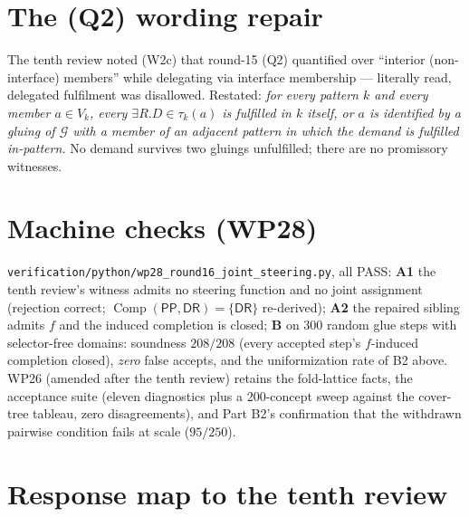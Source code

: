 \documentclass[11pt]{article}
\theoremstyle{definition}
\newcommand{\PP}{\mathsf{PP}}
\newcommand{\DR}{\mathsf{DR}}
\newcommand{\Comp}{\operatorname{Comp}}
\newcommand{\code}[1]{\texttt{#1}}
\begin{document}
\section{The (Q2) wording repair}\label{sec:q2}

The tenth review noted (W2c) that round-15 (Q2) quantified over
``interior (non-interface) members'' while delegating via interface
membership --- literally read, delegated fulfilment was disallowed.
Restated: \emph{for every pattern $k$ and every member $a\in V_k$,
every $\exists R.D\in\tau_k(a)$ is fulfilled in $k$ itself, or $a$ is
identified by a gluing of $\mathcal G$ with a member of an adjacent
pattern in which the demand is fulfilled in-pattern.}  No demand
survives two gluings unfulfilled; there are no promissory witnesses.

\section{Machine checks (WP28)}\label{sec:wp}

\code{verification/python/wp28\_round16\_joint\_steering.py}, all PASS:
\textbf{A1} the tenth review's witness admits no steering function and
no joint assignment (rejection correct; $\Comp(\PP,\DR)=\{\DR\}$
re-derived); \textbf{A2} the repaired sibling admits $f$ and the
induced completion is closed; \textbf{B} on 300 random glue steps with
selector-free domains: soundness $208/208$ (every accepted step's
$f$-induced completion closed), \emph{zero} false accepts, and the
uniformization rate of B2 above.  WP26 (amended after the tenth
review) retains the fold-lattice facts, the acceptance suite (eleven
diagnostics plus a 200-concept sweep against the cover-tree tableau,
zero disagreements), and Part B2's confirmation that the withdrawn
pairwise condition fails at scale ($95/250$).

\section{Response map to the tenth review}\label{sec:resp}
\end{document}
